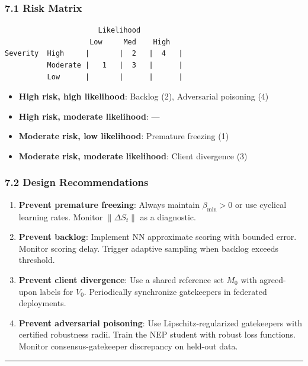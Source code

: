 \documentclass[
  12pt,
]{article}
\providecommand{\tightlist}{%
  \setlength{\itemsep}{0pt}\setlength{\parskip}{0pt}}
\begin{document}
\subsubsection{7.1 Risk Matrix}\label{risk-matrix}

\begin{verbatim}
                      Likelihood
                    Low     Med    High
Severity  High     |       |  2   |  4   |
          Moderate |   1   |  3   |      |
          Low      |       |      |      |
\end{verbatim}

\begin{itemize}
\tightlist
\item
  \textbf{High risk, high likelihood}: Backlog (2), Adversarial
  poisoning (4)
\item
  \textbf{High risk, moderate likelihood}: ---
\item
  \textbf{Moderate risk, low likelihood}: Premature freezing (1)
\item
  \textbf{Moderate risk, moderate likelihood}: Client divergence (3)
\end{itemize}

\subsubsection{7.2 Design Recommendations}\label{design-recommendations}

\begin{enumerate}
\def\labelenumi{\arabic{enumi}.}
\item
  \textbf{Prevent premature freezing}: Always maintain
  \(\beta_{\min} > 0\) or use cyclical learning rates. Monitor
  \(\|\Delta S_t\|\) as a diagnostic.
\item
  \textbf{Prevent backlog}: Implement NN approximate scoring with
  bounded error. Monitor scoring delay. Trigger adaptive sampling when
  backlog exceeds threshold.
\item
  \textbf{Prevent client divergence}: Use a shared reference set \(M_0\)
  with agreed-upon labels for \(V_0\). Periodically synchronize
  gatekeepers in federated deployments.
\item
  \textbf{Prevent adversarial poisoning}: Use Lipschitz-regularized
  gatekeepers with certified robustness radii. Train the NEP student
  with robust loss functions. Monitor consensus-gatekeeper discrepancy
  on held-out data.
\end{enumerate}

\begin{center}\rule{0.5\linewidth}{0.5pt}\end{center}
\end{document}
